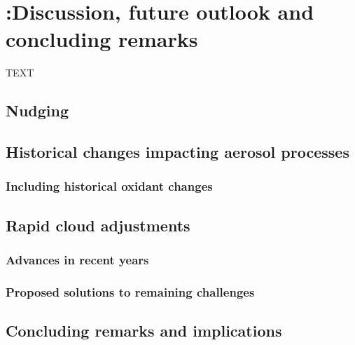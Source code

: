 \chapter[Discussion, future outlook and concluding remarks]{{\color{red} :}Discussion, future outlook and concluding remarks}
\label{ch:discussion}

\noindent TEXT


\section{Nudging}

\section{Historical changes impacting aerosol processes}

\subsection{Including historical oxidant changes}

\section{Rapid cloud adjustments}\label{ch:rapidcloudadj}


\subsection{Advances in recent years}

\subsection{Proposed solutions to remaining challenges}

\section{Concluding remarks and implications}
